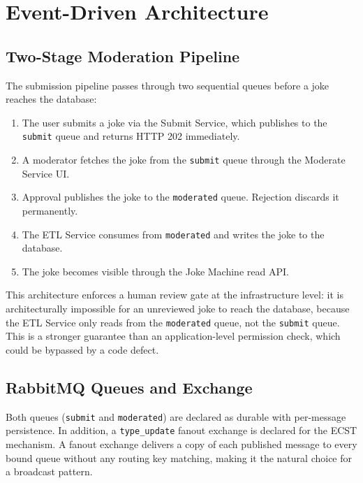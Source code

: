 \documentclass[12pt,a4paper]{article}
\begin{document}
\section{Event-Driven Architecture}

\subsection{Two-Stage Moderation Pipeline}

The submission pipeline passes through two sequential queues before a joke reaches the database:

\begin{enumerate}[leftmargin=2em, itemsep=3pt]
  \item The user submits a joke via the Submit Service, which publishes to the \texttt{submit} queue and returns HTTP 202 immediately.
  \item A moderator fetches the joke from the \texttt{submit} queue through the Moderate Service UI.
  \item Approval publishes the joke to the \texttt{moderated} queue. Rejection discards it permanently.
  \item The ETL Service consumes from \texttt{moderated} and writes the joke to the database.
  \item The joke becomes visible through the Joke Machine read API.
\end{enumerate}

This architecture enforces a human review gate at the infrastructure level: it is architecturally impossible for an unreviewed joke to reach the database, because the ETL Service only reads from the \texttt{moderated} queue, not the \texttt{submit} queue. This is a stronger guarantee than an application-level permission check, which could be bypassed by a code defect.

\subsection{RabbitMQ Queues and Exchange}

Both queues (\texttt{submit} and \texttt{moderated}) are declared as durable with per-message persistence. In addition, a \texttt{type\_update} fanout exchange is declared for the ECST mechanism. A fanout exchange delivers a copy of each published message to every bound queue without any routing key matching, making it the natural choice for a broadcast pattern.
\end{document}
